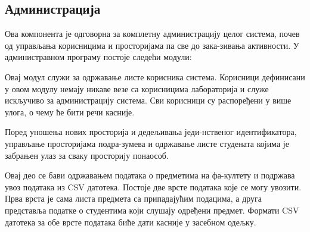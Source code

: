 \documentclass[a4paper, 12pt, diplomski]{etfcyr}
\makeatletter
\newcommand{\indentfirstparagraphoff}{
	\renewenvironment{justify}{%
		\trivlist
		\justifying
		\item\relax
	}{
		\endtrivlist
	}
}
\gdef\tshortstack{\@ifnextchar[\@tshortstack{\@tshortstack[c]}}
\let\@tshortstack\@shortstack
\makeatother
\begin{document}
			\subsection{Администрација}
				\begin{justify}
					Ова компонента је одговорна за комплетну администрацију целог система, почев од управљања корисницима и просторијама па све до зака-зивања активности. У администравном програму постоје следећи модули:

					\begin{labeling}{\smash{\tshortstack[l]{Управљање\\активностима}}}
						\indentfirstparagraphoff

						\item[\smash{\tshortstack[l]{Управљање\\системским\\корисницима}}]
							\begin{justify}
								Овај модул служи за одржавање листе корисника система. Корисници дефинисани у овом модулу немају никаве везе са корисницима лабораторија и служе искључиво за администрацију система. Сви корисници су распоређени у више улога, о чему ће бити речи касније.
							\end{justify}

						\item[\smash{\tshortstack[l]{Управљање\\просторијама}}]
							\begin{justify}
								Поред уношења нових просторија и дедељивања једи-нственог идентификатора, управљање просторијама подра-зумева и одржавање листе студената којима је забрањен улаз за сваку просторију понаособ.
							\end{justify}

						\item[\smash{\tshortstack[l]{Управљање\\предметима}}]
							\begin{justify}
								Овај део се бави одржавањем података о предметима на фа-култету и подржава увоз података из CSV датотека. Постоје две врсте података које се могу увозити. Прва врста је сама листа предмета са припадајућим подацима, а друга представља податке о студентима који слушају одређени предмет. Формати CSV датотека за обе врсте података биће дати касније у засебном одељку.
							\end{justify}


\end{labeling}
\end{justify}
\end{document}
